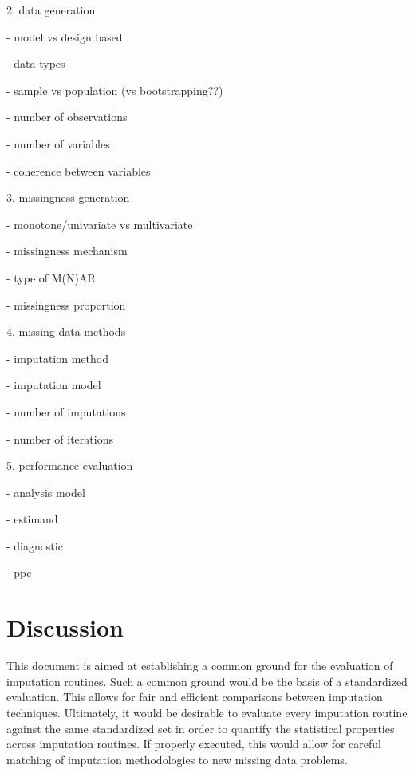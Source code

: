 \documentclass[bimj,fleqn]{w-art}
\theoremstyle{plain}
\theoremstyle{definition}
\begin{document}
2. data generation

- model vs design based

- data types

- sample vs population (vs bootstrapping??)

- number of observations

- number of variables

- coherence between variables


3. missingness generation

- monotone/univariate vs multivariate

- missingness mechanism

- type of M(N)AR

- missingness proportion 

4. missing data methods

- imputation method

- imputation model

- number of imputations

- number of iterations

5. performance evaluation

- analysis model

- estimand

- diagnostic

- ppc



\section{Discussion}

This document is aimed at establishing a common ground for the evaluation of imputation routines. Such a common ground would be the basis of a standardized evaluation. This allows for fair and efficient comparisons between imputation techniques. Ultimately, it would be desirable to evaluate every imputation routine against the same standardized set in order to quantify the statistical properties across imputation routines. If properly executed, this would allow for careful matching of imputation methodologies to new missing data problems. 



\begin{acknowledgement}
\end{acknowledgement}
\vspace*{1pc}
\end{document}
